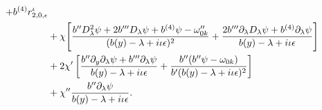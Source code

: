\documentclass[reqno,11pt]{amsart}
\numberwithin{equation}{section}
\numberwithin{equation}{section} %
\begin{document}
\begin{enumerate}
\begin{align}
+b^{(4)}r_{2,0,\epsilon}^{\iota} \notag\\
&+\chi\Biggl[\frac{b''D_\lambda^2\psi+2b'''D_\lambda\psi
+b^{(4)}\psi-\omega_{0k}''}{(b(y)-\lambda+i\iota\epsilon)^2}+\frac{2b'''\partial_\lambda D_\lambda\psi
+b^{(4)}\partial_\lambda\psi}{b(y)-\lambda+i\iota\epsilon}\Biggr] \notag\\
&+2\chi'\left[\frac{b''\partial_y\partial_\lambda\psi
+b'''\partial_\lambda\psi}{b(y)-\lambda+i\iota\epsilon}
+\frac{b''(b''\psi-\omega_{0k})}{b'(b(y)-\lambda+i\iota\epsilon)^2}\right] \notag\\
&+\chi''\frac{b''\partial_\lambda\psi}{b(y)-\lambda+i\iota\epsilon}.\notag
\end{align}




\end{enumerate}
\end{document}
